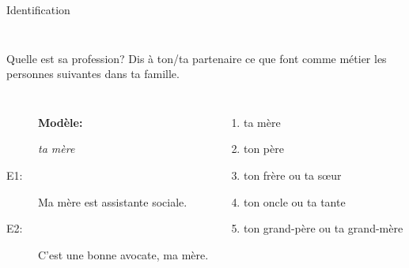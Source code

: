 \documentclass{beamer}
\begin{document}
\begin{frame}{Identification}
\begin{columns}
\begin{minipage}[c][0.6\textheight]{\linewidth}
\begin{center}
{            }
          \end{center}
        \end{minipage}
    \end{columns}
  \end{frame}

  \begin{frame}{Quelle est sa profession?}
    Dis à ton/ta partenaire ce que font comme métier les personnes suivantes dans ta famille. \\
    \begin{columns}
        \begin{description}
          \item[] \textbf{Modèle:}
          \item[] \emph{ta mère}
          \item[E1:] Ma mère est assistante sociale.
          \item[] 
          \item[E2:] C'est une bonne avocate, ma mère.
          \item[] 
        \end{description}
        \begin{enumerate}
          \item ta mère
          \item ton père
          \item ton frère ou ta sœur
          \item ton oncle ou ta tante
          \item ton grand-père ou ta grand-mère
        \end{enumerate}
    \end{columns}
  \end{frame}
\end{document}
